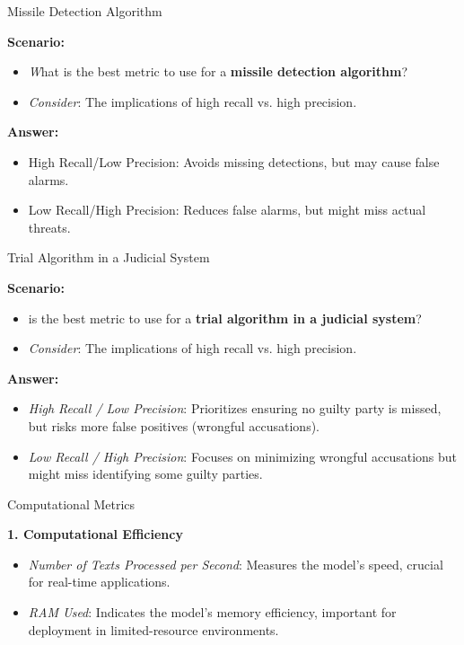 \documentclass{beamer}
\begin{document}

\begin{frame}{Missile Detection Algorithm}

\textbf{Scenario:}
\begin{itemize}
  \item \textit What is the best metric to use for a \textbf{missile detection algorithm}?
  \item \textit{Consider}: The implications of high recall vs. high precision.
\end{itemize}
\pause

\textbf{Answer:}
\begin{itemize}
  \item High Recall/Low Precision: Avoids missing detections, but may cause false alarms.
  \item Low Recall/High Precision: Reduces false alarms, but might miss actual threats.
\end{itemize}
\end{frame}


\begin{frame}{Trial Algorithm in a Judicial System}

\textbf{Scenario:}
\begin{itemize}
  \item \textitWhat is the best metric to use for a \textbf{trial algorithm in a judicial system}?
  \item \textit{Consider}: The implications of high recall vs. high precision.
\end{itemize}
\pause

\textbf{Answer:}
\begin{itemize}
  \item \textit{High Recall / Low Precision}: Prioritizes ensuring no guilty party is missed, but risks more false positives (wrongful accusations).
  \item \textit{Low Recall / High Precision}: Focuses on minimizing wrongful accusations but might miss identifying some guilty parties.
\end{itemize}

\end{frame}


\begin{frame}{Computational Metrics}

\textbf{1. Computational Efficiency}
\begin{itemize}
  \item \textit{Number of Texts Processed per Second}: Measures the model's speed, crucial for real-time applications.
  \item \textit{RAM Used}: Indicates the model's memory efficiency, important for deployment in limited-resource environments.
\end{itemize}

\end{frame}
\end{document}
